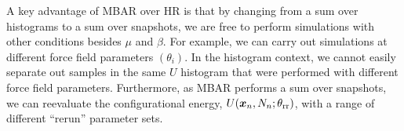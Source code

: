 \documentclass[journal=jced,manuscript=article]{achemso}
\newcommand{\bfv}[1]{{\mbox{\boldmath{$#1$}}}}
\newcommand{\x}{\bfv{x}}
\begin{document}

%
%

A key advantage of MBAR over HR is that by changing from a sum over histograms to a sum over snapshots, we are free to perform simulations with other conditions besides $\mu$ and $\beta$. For example, we can carry out simulations at different force field parameters $(\theta_i)$. In the histogram context, we cannot easily separate out samples in the same $U$ histogram that were performed with different force field parameters. Furthermore, as MBAR performs a sum over snapshots, we can reevaluate the configurational energy, $U(\x_{n},N_n;\theta_{\rm rr})$, with a range of different ``rerun'' parameter sets.
\end{document}
